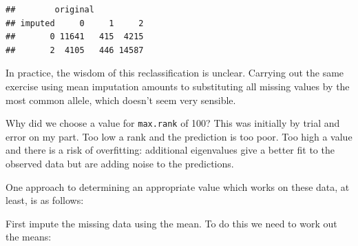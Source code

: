 \documentclass[
]{book}
\newenvironment{Shaded}{\begin{snugshade}}{\end{snugshade}}
\newcommand{\AttributeTok}[1]{\textcolor[rgb]{0.77,0.63,0.00}{#1}}
\newcommand{\CommentTok}[1]{\textcolor[rgb]{0.56,0.35,0.01}{\textit{#1}}}
\newcommand{\ControlFlowTok}[1]{\textcolor[rgb]{0.13,0.29,0.53}{\textbf{#1}}}
\newcommand{\DecValTok}[1]{\textcolor[rgb]{0.00,0.00,0.81}{#1}}
\newcommand{\FloatTok}[1]{\textcolor[rgb]{0.00,0.00,0.81}{#1}}
\newcommand{\FunctionTok}[1]{\textcolor[rgb]{0.00,0.00,0.00}{#1}}
\newcommand{\NormalTok}[1]{#1}
\newcommand{\OtherTok}[1]{\textcolor[rgb]{0.56,0.35,0.01}{#1}}
\newcommand{\SpecialCharTok}[1]{\textcolor[rgb]{0.00,0.00,0.00}{#1}}
\begin{document}
\begin{verbatim}
##        original
## imputed     0     1     2
##       0 11641   415  4215
##       2  4105   446 14587
\end{verbatim}

In practice, the wisdom of this reclassification is unclear. Carrying out the same exercise using mean imputation amounts to substituting all missing values by the most common allele, which doesn't seem very sensible.

Why did we choose a value for \texttt{max.rank} of 100? This was initially by trial and error on my part. Too low a rank and the prediction is too poor. Too high a value and there is a risk of overfitting: additional eigenvalues give a better fit to the observed data but are adding noise to the predictions.

One approach to determining an appropriate value which works on these data, at least, is as follows:

First impute the missing data using the mean. To do this we need to work out the means:

\begin{Shaded}
\end{Shaded}
\end{document}
